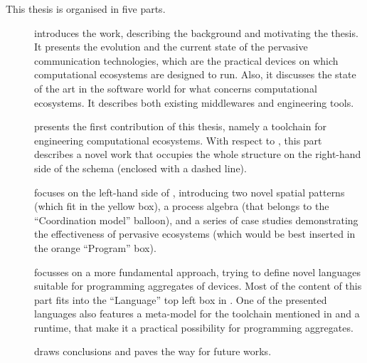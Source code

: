 \documentclass[12pt,a4paper,twoside,openright]{book}
\begin{document}
This thesis is organised in five parts.

\begin{description}
 \item [] introduces the work, describing the background and motivating the thesis. It presents the evolution and the current state of the pervasive communication technologies, which are the practical devices on which computational ecosystems are designed to run. Also, it discusses the state of the art in the software world for what concerns computational ecosystems. It describes both existing middlewares and engineering tools.
 \item [] presents the first contribution of this thesis, namely a toolchain for engineering computational ecosystems. With respect to , this part describes a novel work that occupies the whole structure on the right-hand side of the schema (enclosed with a dashed line).
 \item [] focuses on the left-hand side of , introducing two novel spatial patterns (which fit in the yellow box), a process algebra (that belongs to the ``Coordination model'' balloon), and a series of case studies demonstrating the effectiveness of pervasive ecosystems (which would be best inserted in the orange ``Program'' box).
 \item [] focusses on a more fundamental approach, trying to define novel languages suitable for programming aggregates of devices. Most of the content of this part fits into the ``Language'' top left box in . One of the presented languages also features a meta-model for the toolchain mentioned in  and a runtime, that make it a practical possibility for programming aggregates.
 \item [] draws conclusions and paves the way for future works.
\end{description}
\end{document}
